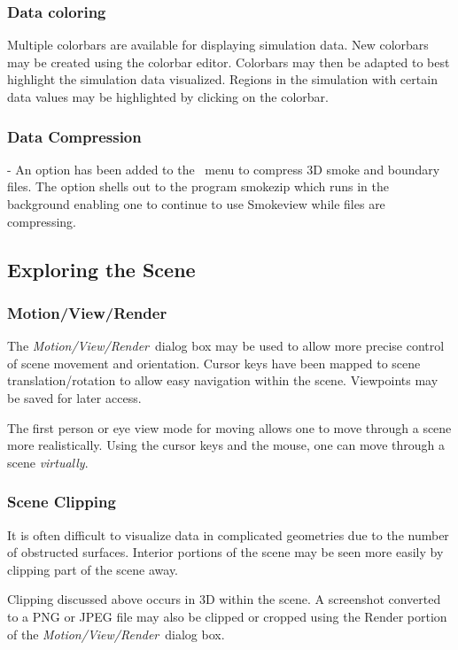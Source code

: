 \documentclass[11pt,twoside]{book}
\begin{document}
\subsubsection{Data coloring} Multiple colorbars are available for displaying simulation data.
New colorbars may be created using the colorbar editor.  Colorbars may then be adapted to best highlight the simulation data visualized.
Regions in the simulation with certain data values may be highlighted by clicking on the colorbar.

\subsubsection{Data Compression} - An option has been added to the
\ menu to compress 3D smoke and boundary
files. The option shells out to the program smokezip which runs in
the background enabling one to continue to use Smokeview while
files are compressing.

\subsection{Exploring the Scene}

\subsubsection{Motion/View/Render} The {\em Motion/View/Render}\ dialog box may be used to
allow more precise control of scene movement and orientation.
Cursor keys have been mapped to scene translation/rotation to
allow easy navigation within the scene.  Viewpoints may be saved for later access.

The first person or eye view mode for moving
allows one to move through a scene more
realistically.  Using the cursor keys and the
mouse, one can move through a scene {\em virtually}.

\subsubsection{Scene Clipping} It is often difficult to visualize data
in complicated geometries due to the number of obstructed
surfaces. Interior portions of the scene may be seen more easily
by clipping part of the scene away.

Clipping discussed above occurs in 3D within the scene.  A
screenshot converted to a PNG or JPEG file may also be clipped or
cropped using the Render portion of the {\em Motion/View/Render}\
dialog box.
\end{document}
